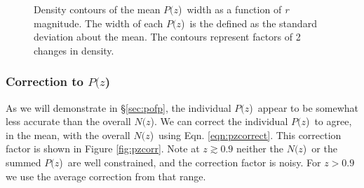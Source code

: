 \documentclass[preprint]{aastex}
\newcommand{\pofz}{$P(z$)}
\newcommand{\Nofz}{$N(z$)}
\begin{document}
\begin{figure}[p]\centering
    \caption{Density contours of the mean \pofz\ width as a function of {\it r} magnitude. 
The width of each \pofz\ is the defined as the standard deviation about the mean. 
The contours represent factors of 2 changes in density.}
    \label{fig:pzwidth}
    \vspace{2em}
\end{figure}

\subsubsection{Correction to \pofz} \label{sec:pzcorr}

As we will demonstrate in \S \ref{sec:pofp}, the individual \pofz\ appear to be
somewhat less accurate than the overall \Nofz.  We can correct the individual
\pofz\ to agree, in the mean, with the overall \Nofz\ using Eqn.
\ref{eqn:pzcorrect}.  This correction factor is shown in Figure
\ref{fig:pzcorr}.  Note at $z \gtrsim 0.9$ neither the \Nofz\ or the summed
\pofz\ are well constrained, and the correction factor is noisy.  For $z > 0.9$
we use the average correction from that range.
\end{document}
